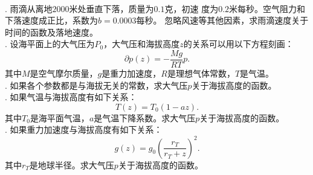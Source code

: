 \documentclass[12pt,UTF8]{ctexbook}
\begin{document}
\begin{et}
    \mbox{} \\
    . 雨滴从离地$2000$米处垂直下落，质量为$0.1$克，初速
    度为$0.2$米每秒。空气阻力和下落速度成正比，系数为$b=0.0003$每秒。
    忽略风速等其他因素，求雨滴速度关于时间的函数及落地速度。\\
    . 设海平面上的大气压为$P_0$，大气压和海拔高度$z$的关系可以用以下方程刻画：
    $$ \partial p(z) = -\frac{Mg}{RT} p. $$
    其中$M$是空气摩尔质量，$g$是重力加速度，$R$是理想气体常数，$T$是气温。\\
    . 如果各个参数都是与海拔无关的常数，求大气压$p$关于海拔高度的函数。\\
    . 如果气温与海拔高度有如下关系：
    $$ T(z) = T_0(1 - az).$$
    其中$T_0$是海平面气温，$a$是气温下降系数。求大气压$p$关于海拔高度的函数。\\
    . 如果重力加速度与海拔高度有如下关系：
    $$ g(z) = g_0 \left(\frac{r_T}{r_T + z}\right)^2. $$
    其中$r_T$是地球半径。求大气压$p$关于海拔高度的函数。

\end{et}
\end{document}
